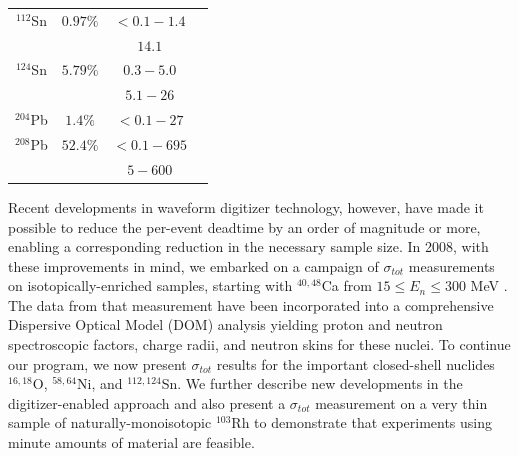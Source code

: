 \documentclass[twocolumn,secnumarabic,amssymb, nobibnotes, aps, prl,
superscriptaddress, nobalancelastpage]{revtex4}
\newcommand{\tots}{\ensuremath{\sigma_{tot}}\,\,}
\begin{document}
\begin{table}[ht]
\begin{center}
\begin{tabular}{ c c c c }
            $^{112}$Sn & $0.97\%$ & $<0.1-1.4$ & \cite{Timokhov1989}\\
            & & $14.1$ & \cite{Dukarevich1967}\\

            $^{124}$Sn & $5.79\%$ & $0.3-5.0$ & \cite{Harper1982}\\
            & & $5.1-26$ & \cite{Rapaport1980}\\

            $^{204}$Pb & $1.4\%$ & $<0.1-27$ & \cite{Carlton2003}\\

            $^{208}$Pb & $52.4\%$ & $<0.1 - 695$ & \cite{Harvey1999}\\
            & & $5-600$ & \cite{Finlay1993}\\

            \hline
        \end{tabular}
    \end{center}
\end{table}

Recent developments in waveform digitizer technology, however, have made it
possible to reduce the per-event deadtime by an order of magnitude or more,
enabling a corresponding reduction in the necessary sample size. In 2008, with
these improvements in mind, we
embarked on a campaign of \tots measurements on isotopically-enriched samples,
starting with $^{40,48}$Ca from $15 \leq E_{n} \leq 300$ MeV \cite{Shane2010}.
The data from that measurement have been incorporated into a comprehensive
Dispersive Optical Model (DOM) analysis \cite{Mueller2011, Mahzoon2014,
MahzoonPhDThesis} yielding proton and neutron spectroscopic factors, charge
radii, and neutron skins \cite{Mahzoon2017} for these nuclei. To continue our
program, we now present \tots results for the important closed-shell nuclides
$^{16,18}$O, $^{58,64}$Ni, and $^{112,124}$Sn. We further describe
new developments in the digitizer-enabled approach and also present a \tots measurement
on a very thin sample of naturally-monoisotopic $^{103}$Rh to demonstrate that
experiments using minute amounts of material are feasible.
\end{document}
